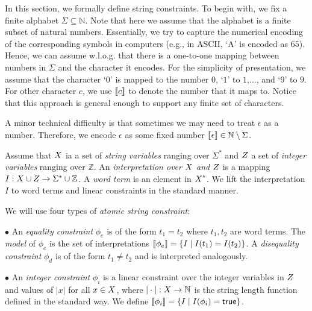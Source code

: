 \documentclass[sigplan,review,anonymous]{acmart}\settopmatter{printfolios=true,printccs=false,printacmref=false}
\begin{document}
In this section, we formally define string constraints. To begin with, we fix a finite alphabet $\Sigma \subseteq \mathbb{N}$. Note that here we assume that the alphabet is a finite subset of natural numbers. Essentially, we try to capture the numerical encoding of the corresponding symbols in computers (e.g., in ASCII, `A' is encoded as $65$). Hence, we can  assume w.l.o.g. that  there is a one-to-one mapping between numbers in $\Sigma$ and the character it encodes. For the simplicity of presentation, we assume that the character `$0$' is mapped to the number $0$, `$1$' to $1$,$\ldots$, and `$9$' to $9$. For other character $c$, we use $[\![c]\!]$ to denote the number that it maps to. Notice that this approach is general enough to support any finite set of characters. 


A minor technical difficulty is that sometimes  we may need to treat  $\epsilon$ as a  number. Therefore, we encode $\epsilon$ as some fixed number $[\![\epsilon]\!]\in\mathbb{N}\setminus\Sigma$.

Assume that $\mbox{$X$}$ ia a set of \emph{string variables} ranging over $\Sigma^*$ and $\mbox{$Z$}$ a set of \emph{integer variables} ranging over $\mathbb{Z}$.
An \emph{interpretation over $\mbox{$X$}$ and $\mbox{$Z$}$} is a mapping $I:\mbox{$X$}\cup \mbox{$Z$}\rightarrow\Sigma^* \cup \mathbb{Z}$. A \emph{word term} is an element in $\mbox{$X$}^*$. We lift the interpretation $I$ to word terms and linear constraints in the standard manner. 

We will use four types of \emph{atomic string constraint}: 
\smallskip


$\bullet$ An \emph{equality constraint} $\phi_e$ is of the form $t_1 = t_2$ where $t_1, 
t_2$ are word terms. The \emph{model} of $\phi_e$ is the set of interpretations $[\![\phi_e]\!]=\{I\mid 
I(t_1)=I(t_2)\}$. A \emph{disequality constraint} $\phi_d$ is of the form $t_1 \neq 
t_2$ and is interpreted analogously.

\smallskip
$\bullet$ An \emph{integer constraint} $\phi_i$ is a linear constraint over the integer variables in $\mbox{$Z$}$ and values of $|x|$ for all $x \in \mbox{$X$}$, where $|\cdot|:\mbox{$X$} \rightarrow \mathbb{N}$ is the string length function defined in the standard way.
We define $[\![\phi_i]\!]= \{I \mid I(\phi_i)= \mbox{$\mathsf{true}$} \}$. 
\smallskip
\end{document}
